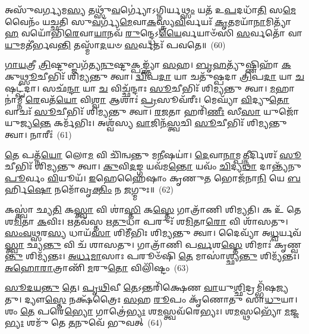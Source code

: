 𑌅𑌸𑍁᳴𑌵𑌰𑍍𑌗𑍍𑌯𑌮\-\ul{𑌸𑍍𑌯} 𑌤𑌥𑍍𑌸𑍁᳴\-\ul{𑌵}\-𑌰𑍍𑌗𑍍𑌯𑍋॑\-𑌽𑌗𑍍𑌨𑌿𑌰𑍍𑌯\-\ul{𑌥𑍍𑌸𑌂} 𑌯𑌤᳴ 𑌉\-\ul{𑌪}\-𑌦𑌧𑌾᳴\-\ul{𑌤𑌿} 𑌸\-\ul{𑌮𑍇}\-𑌵𑍈𑌨𑌂᳴ 𑌯𑌚𑍍𑌛𑌤𑌿 𑌸𑍁\-\ul{𑌵}\-𑌰𑍍𑌗𑍍𑌯᳴\-\ul{𑌮𑍇}\-𑌵𑌾\-\ul{𑌕}\-𑌸𑍍𑌤𑍍𑌰𑍍𑌯\-\ul{𑌵𑌿}\-𑌰𑍍𑌵𑌯𑌃᳴ \ul{𑌕𑍃}\-𑌤𑌮𑌯𑌾᳴\-\ul{𑌨𑌾}\-𑌮𑌿𑌤𑍍𑌯𑌾᳴\-\ul{𑌹} 𑌵𑌯𑍋᳴𑌭𑌿\-\ul{𑌰𑍇}\-𑌵𑌾\-\ul{𑌯𑌾}\-𑌨𑌵᳴ \ul{𑌰𑍁}\-𑌨𑍍𑌦𑍍𑌧𑍇\-𑌽\-\ul{𑌯𑍈}\-𑌰𑍍𑌵𑌯𑌾𑍞᳴𑌸𑌿 \ul{𑌸}\-𑌰𑍍𑌵𑌤𑍋᳴ 𑌵𑌾\-\ul{𑌯𑍁}\-𑌮𑌤𑍀॑𑌰𑍍𑌭𑌵\-\ul{𑌨𑍍𑌤𑌿} 𑌤𑌸𑍍𑌮𑌾᳴\-\ul{𑌦}\-𑌯𑍞 \ul{𑌸}\-𑌰𑍍𑌵𑌤𑌃᳴ 𑌪𑌵𑌤𑍇॥~(60)

{\anuvakamend[{\-\ul{𑌪}\-𑌶𑍍𑌚𑌾\-\ul{𑌦𑍇}\-𑌤𑌾𑌃 \ul{𑌪𑍁}\-𑌰𑍋॑\-𑌽\-\ul{𑌕𑍍𑌷𑍍𑌣}\-𑌯𑌾 𑌕\-\ul{𑌲𑍍𑌪}\-𑌤𑍇\-𑌽𑌸𑌂᳴ 𑌯\-\ul{𑌤𑌂} 𑌪𑌞𑍍𑌚᳴𑌤𑍍𑌰𑌿𑍞𑌶𑌚𑍍𑌚}]}%

\-\ul{𑌗𑌾}\-\-\ul{𑌯}\-𑌤𑍍𑌰𑍀 \ul{𑌤𑍍𑌰𑌿}\-𑌷𑍍𑌟𑍁𑌬𑍍𑌜𑌗᳴𑌤𑍍𑌯\-\ul{𑌨𑍁}\-𑌷𑍍𑌟𑍁\-\ul{𑌕𑍍𑌪}\-𑌙𑍍𑌕𑍍𑌤𑍍𑌯𑌾᳴ \ul{𑌸}\-𑌹। \ul{𑌬𑍃}\-\-\ul{𑌹}\-𑌤𑍍𑌯𑍁᳴𑌷𑍍𑌣𑌿𑌹𑌾᳴ \ul{𑌕}\-𑌕𑍁\-\ul{𑌥𑍍𑌸𑍂}\-𑌚𑍀𑌭𑌿𑌃᳴ 𑌶𑌿𑌮𑍍𑌯𑌨𑍍𑌤𑍁 𑌤𑍍𑌵𑌾। \ul{𑌦𑍍𑌵𑌿}\-𑌪\-\ul{𑌦𑌾} 𑌯𑌾 𑌚𑌤𑍁᳴𑌷𑍍𑌪𑌦𑌾 \ul{𑌤𑍍𑌰𑌿}\-𑌪\-\ul{𑌦𑌾} 𑌯𑌾 \ul{𑌚} 𑌷𑌟𑍍𑌪᳴𑌦𑌾। 𑌸𑌛᳴\-\ul{𑌨𑍍𑌦𑌾} 𑌯𑌾 \ul{𑌚} 𑌵𑌿𑌚𑍍𑌛᳴𑌨𑍍𑌦𑌾𑌃 \ul{𑌸𑍂}\-𑌚𑍀𑌭𑌿𑌃᳴ 𑌶𑌿𑌮𑍍𑌯𑌨𑍍𑌤𑍁 𑌤𑍍𑌵𑌾। \ul{𑌮}\-𑌹𑌾𑌨𑌾॑𑌮𑍍𑌨𑍀 \ul{𑌰𑍇}\-𑌵𑌤᳴\-\ul{𑌯𑍋} 𑌵𑌿\-\ul{𑌶𑍍𑌵𑌾} 𑌆𑌶𑌾𑌃॑ \ul{𑌪𑍍𑌰}\-𑌸𑍂𑌵᳴𑌰𑍀𑌃। 𑌮𑍇𑌘𑍍𑌯𑌾᳴ \ul{𑌵𑌿}\-𑌦𑍍𑌯𑍁\-\ul{𑌤𑍋} 𑌵𑌾𑌚𑌃᳴ \ul{𑌸𑍂}\-𑌚𑍀𑌭𑌿𑌃᳴ 𑌶𑌿𑌮𑍍𑌯𑌨𑍍𑌤𑍁 𑌤𑍍𑌵𑌾। \ul{𑌰}\-\-\ul{𑌜}\-𑌤𑌾 𑌹𑌰𑌿᳴\-\ul{𑌣𑍀𑌃} 𑌸𑍀\-\ul{𑌸𑌾} 𑌯𑍁𑌜𑍋᳴ 𑌯𑍁𑌜𑍍𑌯\-\ul{𑌨𑍍𑌤𑍇} 𑌕𑌰𑍍𑌮᳴𑌭𑌿𑌃। 𑌅𑌶𑍍𑌵᳴𑌸𑍍𑌯 \ul{𑌵𑌾}\-𑌜𑌿𑌨᳴\-\ul{𑌸𑍍𑌤𑍍𑌵}\-𑌚𑌿 \ul{𑌸𑍂}\-𑌚𑍀𑌭𑌿𑌃᳴ 𑌶𑌿𑌮𑍍𑌯𑌨𑍍𑌤𑍁 𑌤𑍍𑌵𑌾। 𑌨𑌾𑌰𑍀𑌃॑~(61)

\-\ul{𑌤𑍇} 𑌪𑌤𑍍𑌨᳴\-\ul{𑌯𑍋} 𑌲𑍋\-\ul{𑌮} 𑌵𑌿 𑌚𑌿᳴𑌨𑍍𑌵𑌨𑍍𑌤𑍁 𑌮\-\ul{𑌨𑍀}\-𑌷𑌯𑌾॑। \ul{𑌦𑍇}\-𑌵𑌾\-\ul{𑌨𑌾}\-𑌮𑍍𑌪\-\ul{𑌤𑍍𑌨𑍀}\-𑌰𑍍𑌦𑌿𑌶𑌃᳴ \ul{𑌸𑍂}\-𑌚𑍀𑌭𑌿𑌃᳴ 𑌶𑌿𑌮𑍍𑌯𑌨𑍍𑌤𑍁 𑌤𑍍𑌵𑌾। \ul{𑌕𑍁}\-𑌵𑌿\-\ul{𑌦}\-𑌙𑍍𑌗 𑌯𑌵᳴𑌮\-\ul{𑌨𑍍𑌤𑍋} 𑌯𑌵𑌂᳴ \ul{𑌚𑌿}\-𑌦𑍍𑌯\-\ul{𑌥𑌾} 𑌦𑌾𑌨𑍍𑌤𑍍𑌯᳴𑌨𑍁\-\ul{𑌪𑍂}\-𑌰𑍍𑌵𑌂 \ul{𑌵𑌿}\-𑌯𑍂𑌯᳴। \ul{𑌇}\-𑌹𑍇𑌹𑍈᳴𑌷𑌾𑌂 𑌕𑍃𑌣𑍁\-\ul{𑌤} 𑌭𑍋𑌜᳴𑌨𑌾\-\ul{𑌨𑌿} 𑌯𑍇 \ul{𑌬}\-𑌰𑍍\mbox{}𑌹𑌿\-\ul{𑌷𑍋} 𑌨𑌮𑍋᳴𑌵𑍃\-\ul{𑌕𑍍𑌤𑌿𑌂} 𑌨 \ul{𑌜}\-𑌗𑍍𑌮𑍁𑌃॥~(62)

{\anuvakamend[{𑌨𑌾𑌰𑍀॑\-\ul{𑌸𑍍𑌤𑍍𑌰𑌿}\-\-\ul{𑍞}\-𑌶𑌚𑍍𑌚᳴}]}%

𑌕𑌸𑍍𑌤𑍍𑌵𑌾॑ 𑌛𑍍𑌯\-\ul{𑌤𑌿} 𑌕\-\ul{𑌸𑍍𑌤𑍍𑌵𑌾} 𑌵𑌿 𑌶𑌾॑\-\ul{𑌸𑍍𑌤𑌿} 𑌕\-\ul{𑌸𑍍𑌤𑍇} 𑌗𑌾𑌤𑍍𑌰𑌾᳴𑌣𑌿 𑌶𑌿𑌮𑍍𑌯𑌤𑌿। 𑌕 𑌉᳴ 𑌤𑍇 𑌶\-\ul{𑌮𑌿}\-𑌤𑌾 \ul{𑌕}\-𑌵𑌿𑌃। \ul{𑌋}\-𑌤𑌵᳴𑌸𑍍𑌤 𑌋\-\ul{𑌤𑍁}\-𑌧𑌾 𑌪𑌰𑍁𑌃᳴ 𑌶\-\ul{𑌮𑌿}\-𑌤𑌾\-\ul{𑌰𑍋} 𑌵𑌿 𑌶𑌾᳴𑌸𑌤𑍁। \ul{𑌸𑌂}\-\-\ul{𑌵}\-\-\ul{𑌥𑍍𑌸}\-𑌰\-\ul{𑌸𑍍𑌯} 𑌧𑌾𑌯᳴\-\ul{𑌸𑌾} 𑌶𑌿𑌮𑍀᳴𑌭𑌿𑌃 𑌶𑌿𑌮𑍍𑌯𑌨𑍍𑌤𑍁 𑌤𑍍𑌵𑌾। 𑌦𑍈𑌵𑍍𑌯𑌾᳴ 𑌅\-\ul{𑌧𑍍𑌵}\-𑌰𑍍𑌯𑌵᳴\-\ul{𑌸𑍍𑌤𑍍𑌵𑌾} 𑌛𑍍𑌯\-\ul{𑌨𑍍𑌤𑍁} 𑌵𑌿 𑌚᳴ 𑌶𑌾𑌸𑌤𑍁। 𑌗𑌾𑌤𑍍𑌰𑌾᳴𑌣𑌿 𑌪\-\ul{𑌰𑍍𑌵}\-𑌶\-\ul{𑌸𑍍𑌤𑍇} 𑌶𑌿𑌮𑌾𑌃॑ 𑌕𑍃𑌣𑍍𑌵\-\ul{𑌨𑍍𑌤𑍁} 𑌶𑌿𑌮𑍍𑌯᳴𑌨𑍍𑌤𑌃। \ul{𑌅}\-\-\ul{𑌰𑍍𑌧}\-\-\ul{𑌮𑌾}\-𑌸𑌾𑌃 𑌪𑌰𑍂𑍞᳴𑌷𑌿 \ul{𑌤𑍇} 𑌮𑌾𑌸𑌾॑𑌶𑍍𑌛𑍍𑌯\-\ul{𑌨𑍍𑌤𑍁} 𑌶𑌿𑌮𑍍𑌯᳴𑌨𑍍𑌤𑌃। \ul{𑌅}\-\-\ul{𑌹𑍋}\-\-\ul{𑌰𑌾}\-𑌤𑍍𑌰𑌾𑌣𑌿᳴ \ul{𑌮}\-𑌰𑍁\-\ul{𑌤𑍋} 𑌵𑌿𑌲𑌿᳴𑌷𑍍𑌟𑌂~(63)

\-\ul{𑌸𑍂}\-\-\ul{𑌦}\-\-\ul{𑌯}\-\-\ul{𑌨𑍍𑌤𑍁} \ul{𑌤𑍇}\-। \ul{𑌪𑍃}\-\-\ul{𑌥𑌿}\-𑌵𑍀 \ul{𑌤𑍇}\-\-𑌽𑌨𑍍𑌤𑌰𑌿᳴𑌕𑍍𑌷𑍇𑌣 \ul{𑌵𑌾}\-𑌯𑍁\-\ul{𑌶𑍍𑌛𑌿}\-𑌦𑍍𑌰𑌮𑍍𑌭𑌿᳴𑌷𑌜𑍍𑌯𑌤𑍁। 𑌦𑍍𑌯𑍗\-\ul{𑌸𑍍𑌤𑍇} 𑌨𑌕𑍍𑌷᳴𑌤𑍍𑌰𑍈𑌃 \ul{𑌸}\-𑌹 \ul{𑌰𑍂}\-𑌪𑌂 𑌕𑍃᳴𑌣𑍋𑌤𑍁 𑌸𑌾\-\ul{𑌧𑍁}\-𑌯𑌾। 𑌶𑌂 \ul{𑌤𑍇} 𑌪𑌰𑍇॑\-\ul{𑌭𑍍𑌯𑍋} 𑌗𑌾𑌤𑍍𑌰𑍇॑\-\ul{𑌭𑍍𑌯𑌃} 𑌶\-\ul{𑌮}\-𑌸𑍍𑌤𑍍𑌵𑌵᳴𑌰𑍇𑌭𑍍𑌯𑌃। 𑌶\-\ul{𑌮}\-𑌸𑍍𑌥𑌭𑍍𑌯𑍋᳴ \ul{𑌮}\-𑌜𑍍𑌜\-\ul{𑌭𑍍𑌯𑌃} 𑌶𑌮𑍁᳴ 𑌤𑍇 \ul{𑌤}\-𑌨𑍁𑌵𑍇᳴ 𑌭𑍁𑌵𑌤𑍍~(64)

